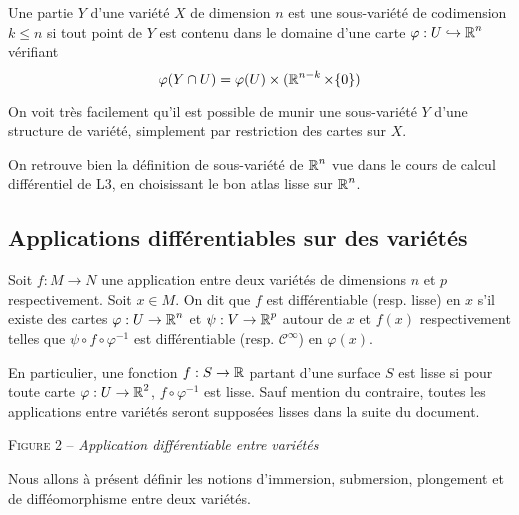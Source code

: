 \begin{defi}
    Une partie $Y$ d'une variété $X$ de dimension $n$ est une sous-variété 
    de codimension $k\leq n$ si tout point de $Y$ est contenu dans le domaine 
    d'une carte $\varphi:U\hookrightarrow\operatorname{\mathbb R}^n$ vérifiant 
    \[
        \varphi(Y\cap U)=\varphi(U)\times(\operatorname{\mathbb R}^{n-k}\times\lbrace 0\rbrace)
    \]
\end{defi}

On voit très facilement qu'il est possible de munir une sous-variété $Y$ 
d'une structure de variété, simplement par restriction des cartes sur $X$.

\begin{remark}
    On retrouve bien la définition de sous-variété de $\operatorname{\mathbb R}^n$ vue dans le cours 
    de calcul différentiel de L3, en choisissant le bon atlas lisse sur $\operatorname{\mathbb R}^n$.
\end{remark}

\subsection{Applications différentiables sur des variétés}

\begin{defi}
    Soit $f:M\to N$ une application entre deux variétés de dimensions $n$ et 
    $p$ respectivement. Soit $x\in M$. On dit que $f$ est différentiable 
    (resp. lisse) en $x$ s'il existe des cartes $\varphi:U\to \operatorname{\mathbb R}^n$ et $\psi:V\to\operatorname{\mathbb R}^p$
    autour de $x$ et $f(x)$ respectivement telles que $\psi\circ f\circ\varphi^{-1}$ 
    est différentiable (resp. $\mathcal C^\infty$) en $\varphi(x)$.
\end{defi}

En particulier, une fonction $f:S\to \operatorname{\mathbb R}$ partant d'une surface $S$ est lisse si 
pour toute carte $\varphi:U\to\operatorname{\mathbb R}^2$, $f\circ\varphi^{-1}$ est lisse. Sauf mention 
du contraire, toutes les applications entre variétés seront supposées lisses dans 
la suite du document.

\begin{center}
    
    \textsc{Figure 2} – \textit{Application différentiable entre variétés}
\end{center}

Nous allons à présent définir les notions d'immersion, submersion, plongement et de 
difféomorphisme entre deux variétés. 

